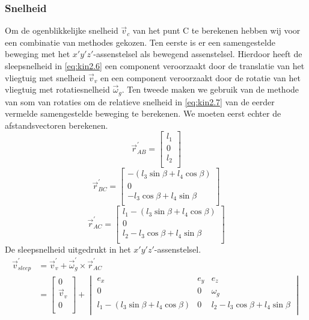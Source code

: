 \subsubsection{Snelheid}
Om de ogenblikkelijke snelheid $\vec{v}_{c}$ van het punt C te berekenen hebben wij voor een combinatie van methodes gekozen. Ten eerste is er een samengestelde beweging met het $x'y'z'$-assenstelsel als bewegend assenstelsel. Hierdoor heeft de sleepsnelheid in \eqref{eq:kin2.6} een component veroorzaakt door de translatie van het vliegtuig met snelheid $\vec{v}_{v}$ en een component veroorzaakt door de rotatie van het vliegtuig met rotatiesnelheid $\vec{\omega}_{g}$. Ten tweede maken we gebruik van de methode van som van rotaties om de relatieve snelheid in \eqref{eq:kin2.7} van de eerder vermelde samengestelde beweging te berekenen. We moeten eerst echter de afstandsvectoren berekenen.
\begin{equation}
\vec{r}_{AB}^{'}=
\begin{bmatrix}
l_{1}\\
0\\
l_{2}\\
\end{bmatrix}
\label{eq:kin2.3}
\end{equation}
\begin{equation}
\vec{r}_{BC}^{'}=
\begin{bmatrix}
-(l_{3}\sin{\beta}+l_{4}\cos{\beta})\\
0\\
-l_{3}\cos{\beta}+l_{4}\sin{\beta}\\
\end{bmatrix}
\label{eq:kin2.4}
\end{equation}
\begin{equation}
\vec{r}_{AC}^{'}=
\begin{bmatrix}
l_{1}-(l_{3}\sin{\beta}+l_{4}\cos{\beta})\\
0\\
l_{2}-l_{3}\cos{\beta}+l_{4}\sin{\beta}\\
\end{bmatrix}
\label{eq:kin2.5}
\end{equation}
De sleepsnelheid uitgedrukt in het $x'y'z'$-assenstelsel.
\begin{equation}
\begin{split}
\vec{v}_{sleep}^{'}&=\vec{v}_{v}^{'}+\vec{\omega}_{g}^{'}\times\vec{r}_{AC}^{'}\\
&=\begin{bmatrix}
0						\\
\vec{v}_{v}	\\
0						\\
\end{bmatrix}
+\begin{vmatrix}
e_{x}&e_{y}&e_{z}\\
0&0&\omega_{g}\\
l_{1}-(l_{3}\sin{\beta}+l_{4}\cos{\beta})&0&l_{2}-l_{3}\cos{\beta}+l_{4}\sin{\beta}\\
\end{vmatrix}\\
\end{split}
\label{eq:kin2.6}
\end{equation}
